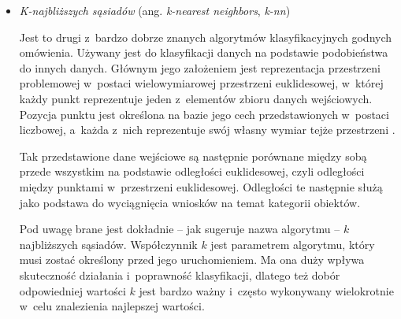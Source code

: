{\begin{itemize}
        Z~tego też powodu rodzaj klasyfikacji, do którego wykorzystywana jest regresja logistyczna nazywa się też \emph{klasyfikacją binarną}.
        W~praktyce oznacza to, że algorytmy tego typu służą do rozróżnienia dokładnie dwóch klas.
        Mogą to być dwie klasy jednostkowe, na przykład czy dany obrazek przedstawia psa czy kota, ale bardzo często są to klasy oznaczające weryfikację ``pozytywną'' lub ``negatywną'' odnośnie posiadania pewnej cechy przez dane wejściowe lub możliwość ich przyporządkowania do jednej konkretnej klasy, na przykład czy dany pacjent jest chory czy nie (inaczej po prostu zdrowy), czy dana wiadomość e-mail jest spamem czy nie.

        Przy interpretacji pojedynczego zadania regresji liniowej jako binarnego przewidywania prawdopodobieństwa przynależności do danej klasy, algorytm ten nazywany jest także \emph{dwumianową regresją logistyczną} (ang. \emph{binomial logistic regression}).
        Algorytm ten może być rozszerzony jednak przez proste zwielokrotnienie takich klasyfikacji binarnych w~celu rozróżnienia wielu klas.
        Wtedy nazywany jest \emph{wielomianową regresją logistyczną} (ang. \emph{multinomial logistic regression}) i~potrafi kategoryzować dane wejściowe do dowolnej liczby klas, na przykład obrazki odręcznie zapisanych cyfr arabskich na 10 klas odpowiadających cyfrom od 0~do 9 \cite{palvanov2018comparisons}.

  \item \emph{K-najbliższych sąsiadów} (ang. \emph{k-nearest neighbors}, \emph{k-nn})

        Jest to drugi z~bardzo dobrze znanych algorytmów klasyfikacyjnych godnych omówienia.
        Używany jest do klasyfikacji danych na podstawie podobieństwa do innych danych.
        Głównym jego założeniem jest reprezentacja przestrzeni problemowej w~postaci wielowymiarowej przestrzeni euklidesowej, w~której każdy punkt reprezentuje jeden z~elementów zbioru danych wejściowych.
        Pozycja punktu jest określona na bazie jego cech przedstawionych w~postaci liczbowej, a~każda z~nich reprezentuje swój własny wymiar tejże przestrzeni \cite{kramer2013k}.

        Tak przedstawione dane wejściowe są następnie porównane między sobą przede wszystkim na podstawie odległości euklidesowej, czyli odległości między punktami w~przestrzeni euklidesowej.
        Odległości te następnie służą jako podstawa do wyciągnięcia wniosków na temat kategorii obiektów.

        Pod uwagę brane jest dokładnie -- jak sugeruje nazwa algorytmu -- $k$ najbliższych sąsiadów.
        Współczynnik $k$ jest parametrem algorytmu, który musi zostać określony przed jego uruchomieniem.
        Ma ona duży wpływa skuteczność działania i~poprawność klasyfikacji, dlatego też dobór odpowiedniej wartości $k$ jest bardzo ważny i~często wykonywany wielokrotnie w~celu znalezienia najlepszej wartości.


\end{itemize}}
